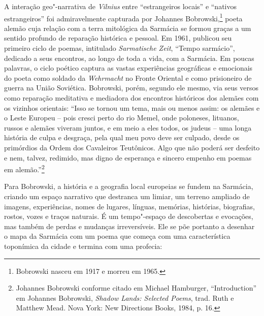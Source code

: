 A interação geo"-narrativa de \textit{Vilnius} entre ``estrangeiros locais'' e
``nativos estrangeiros'' foi admiravelmente capturada por Johannes
Bobrowski,\footnote{Bobrowski nasceu em 1917 e morreu em 1965.} poeta alemão cuja relação com a terra mitológica
da Sarmácia se formou graças a um sentido profundo de reparação
histórica e pessoal. Em 1961, publicou seu primeiro ciclo de poemas,
intitulado \textit{Sarmatische Zeit}, ``Tempo sarmácio'', dedicado a
seus encontros, ao longo de toda a vida, com a Sarmácia. Em poucas
palavras, o ciclo poético captura as vastas experiências geográficas e
emocionais do poeta como soldado da \textit{Wehrmacht} no Fronte Oriental
e como prisioneiro de guerra na União Soviética. Bobrowski, porém,
segundo ele mesmo, via seus versos como reparação meditativa e mediadora
dos encontros históricos dos alemães com os vizinhos orientais: ``Isso
se tornou um tema, mais ou menos assim: os alemães e o Leste Europeu --
pois cresci perto do rio Memel, onde poloneses, lituanos, russos e
alemães viveram juntos, e em meio a eles todos, os judeus -- uma longa
história de culpa e desgraça, pela qual meu povo deve ser culpado, desde
os primórdios da Ordem dos Cavaleiros Teutônicos. Algo que não poderá
ser desfeito e nem, talvez, redimido, mas digno de esperança e sincero
empenho em poemas em alemão.''\footnote{Johannes Bobrowski conforme citado em Michael Hamburger, ``Introduction'' em Johannes Bobrowski, \textit{Shadow Lands: Selected Poems}, trad. Ruth e Matthew Mead. Nova York: New Directions Books, 1984, p. 16.}

Para Bobrowski, a história e a geografia local europeias se fundem na
Sarmácia, criando um espaço narrativo que destranca um limiar, um
terreno ampliado de imagens, experiências, nomes de lugares, línguas,
memórias, histórias, biografias, rostos, vozes e traços naturais. É um
tempo"-espaço de descobertas e evocações, mas também de perdas e mudanças
irreversíveis. Ele se põe portanto a desenhar o mapa da Sarmácia com um
poema que começa com uma característica toponímica da cidade e termina
com uma profecia:

